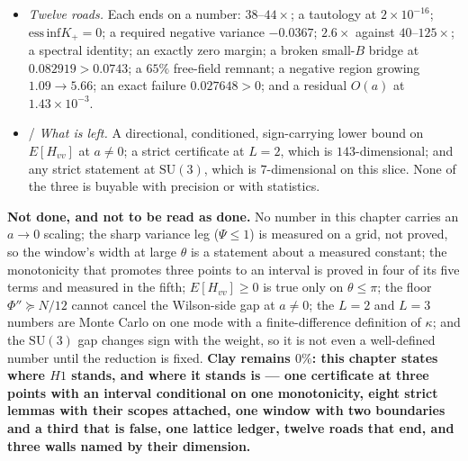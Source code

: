 \begin{itemize}
correction returns $7.3\sigma$. The rank of the evidence is exactly \LE: one window, one mode, no
$a\to0$.
\item \LN{} \emph{Twelve roads.} Each ends on a number: $38$--$44\times$; a tautology at
$2\times10^{-16}$; $\mathrm{ess\,inf}K_{+}=0$; a required negative variance $-0.0367$; $2.6\times$
against $40$--$125\times$; a spectral identity; an exactly zero margin; a broken small-$B$ bridge at
$0.082919>0.0743$; a $65\%$ free-field remnant; a negative region growing $1.09\to5.66$; an exact
failure $0.027648>0$; and a residual $O(a)$ at $1.43\times10^{-3}$.
\item \LM{}/\LN{} \emph{What is left.} A directional, conditioned, sign-carrying lower bound on
$E[H_{vv}]$ at $a\neq0$; a strict certificate at $L=2$, which is $143$-dimensional; and any strict
statement at $\mathrm{SU}(3)$, which is $7$-dimensional on this slice. None of the three is buyable
with precision or with statistics.
\end{itemize}

\textbf{Not done, and not to be read as done.} No number in this chapter carries an $a\to0$ scaling;
the sharp variance leg ($\Psi\le1$) is measured on a grid, not proved, so the window's width at large
$\theta$ is a statement about a measured constant; the monotonicity that promotes three points to an
interval is proved in four of its five terms and measured in the fifth; $E[H_{vv}]\ge0$ is true only on
$\theta\le\pi$; the floor $\Phi''\succeq N/12$ cannot cancel the Wilson-side gap at $a\neq0$; the
$L=2$ and $L=3$ numbers are Monte Carlo on one mode with a finite-difference definition of $\kappa$;
and the $\mathrm{SU}(3)$ gap changes sign with the weight, so it is not even a well-defined number until
the reduction is fixed. \textbf{Clay remains $0\%$: this chapter states where $H1$ stands, and where it
stands is --- one certificate at three points with an interval conditional on one monotonicity, eight
strict lemmas with their scopes attached, one window with two boundaries and a third that is false, one
lattice ledger, twelve roads that end, and three walls named by their dimension.}
